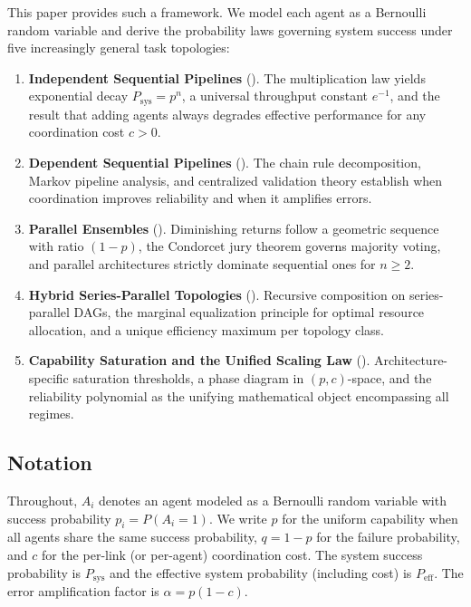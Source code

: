 \documentclass[12pt,a4paper]{article}
\theoremstyle{plain}
\theoremstyle{definition}
\theoremstyle{remark}
\newcommand{\Psys}{P_{\mathrm{sys}}}
\newcommand{\Peff}{P_{\mathrm{eff}}}
\begin{document}
This paper provides such a framework.  We model each agent as a Bernoulli
random variable and derive the probability laws governing system success
under five increasingly general task topologies:

\begin{enumerate}[label=\textbf{Regime \arabic*:}, leftmargin=*]
  \item \textbf{Independent Sequential Pipelines} ().
    The multiplication law yields exponential decay $\Psys = p^n$, a universal
    throughput constant $e^{-1}$, and the result that adding agents always
    degrades effective performance for any coordination cost $c > 0$.

  \item \textbf{Dependent Sequential Pipelines} ().
    The chain rule decomposition, Markov pipeline analysis, and centralized
    validation theory establish when coordination improves reliability and
    when it amplifies errors.

  \item \textbf{Parallel Ensembles} ().
    Diminishing returns follow a geometric sequence with ratio $(1-p)$, the
    Condorcet jury theorem governs majority voting, and parallel architectures
    strictly dominate sequential ones for $n \geq 2$.

  \item \textbf{Hybrid Series-Parallel Topologies} ().
    Recursive composition on series-parallel DAGs, the marginal equalization
    principle for optimal resource allocation, and a unique efficiency maximum
    per topology class.

  \item \textbf{Capability Saturation and the Unified Scaling Law}
    ().
    Architecture-specific saturation thresholds, a phase diagram in $(p,c)$-space,
    and the reliability polynomial as the unifying mathematical object
    encompassing all regimes.
\end{enumerate}

\subsection{Notation}

Throughout, $A_i$ denotes an agent modeled as a Bernoulli random variable with
success probability $p_i = P(A_i = 1)$.  We write $p$ for the uniform
capability when all agents share the same success probability, $q = 1-p$ for
the failure probability, and $c$ for the per-link (or per-agent) coordination
cost.  The system success probability is $\Psys$ and the effective system
probability (including cost) is $\Peff$.  The error amplification factor is
$\alpha = p(1-c)$.
\end{document}
